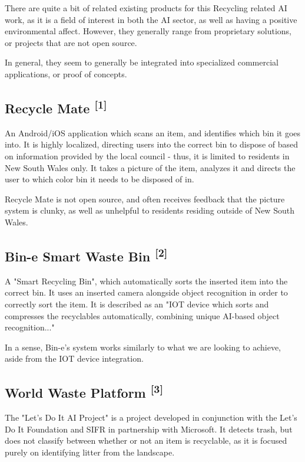\documentclass[conference]{IEEEtran}
\begin{document}
There are quite a bit of related existing products for this Recycling related AI work, as it is a field of interest in both the AI sector, as well as having a positive environmental affect. However, they generally range from proprietary solutions, or projects that are not open source.

In general, they seem to generally be integrated into specialized commercial applications, or proof of concepts.
\newline

\subsection{Recycle Mate \textsuperscript{[1]}}

An Android/iOS application which scans an item, and identifies which bin it goes into. It is highly localized, directing users into the correct bin to dispose of based on information provided by the local council - thus, it is limited to residents in New South Wales only. It takes a picture of the item, analyzes it and directs the user to which color bin it needs to be disposed of in.

Recycle Mate is not open source, and often receives feedback that the picture system is clunky, as well as unhelpful to residents residing outside of New South Wales.
\newline

\subsection{Bin-e Smart Waste Bin \textsuperscript{[2]}}

A "Smart Recycling Bin", which automatically sorts the inserted item into the correct bin. It uses an inserted camera alongside object recognition in order to correctly sort the item. It is described as an "IOT device which sorts and compresses the recyclables automatically, combining unique AI-based object recognition..."

In a sense, Bin-e's system works similarly to what we are looking to achieve, aside from the IOT device integration.
\newline

\subsection{World Waste Platform \textsuperscript{[3]}}

The "Let's Do It AI Project" is a project developed in conjunction with the Let's Do It Foundation and SIFR in partnership with Microsoft. It detects trash, but does not classify between whether or not an item is recyclable, as it is focused purely on identifying litter from the landscape. 
\end{document}
